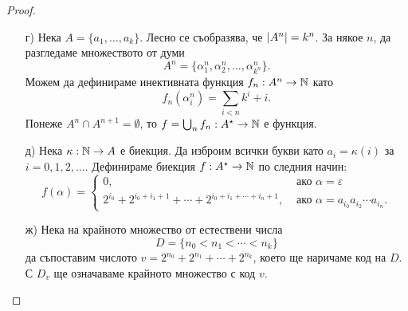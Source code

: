 \begin{proof}
  \begin{enumerate}[a)]
  \item[г)]
    Нека $A = \{a_1,\dots,a_k\}$.
    Лесно се съобразява, че $\lvert{A^n}\rvert = k^n$.
    За някое $n$, да разгледаме множеството от думи 
    \[A^n = \{\alpha^n_{1},\alpha^n_{2},\dots, \alpha^n_{{k^n}}\}.\]
    Можем да дефинираме инективната функция $f_n : A^n \to \mathbb{N}$ като
    \[f_n(\alpha^n_{i}) = \sum_{i<n} k^i + i.\]
    Понеже $A^n \cap A^{n+1} = \emptyset$, 
    то $f = \bigcup_n f_n : A^\star \to \mathbb{N}$ е функция.
  \item[д)]
    Нека $\kappa:\mathbb{N} \to A$ е биекция.
    Да изброим всички букви като $a_i = \kappa(i)$ за $i = 0,1,2,\dots$.
    Дефинираме биекция $f:A^\star \to \mathbb{N}$ по следния начин:
    \[
    f(\alpha) = 
    \begin{cases}
      0,                             & \text{ ако } \alpha = \varepsilon\\
      2^{i_0} + 2^{i_0+i_1+1} + \cdots + 2^{i_0+i_1+\cdots+i_n+1}, & \text{ ако } \alpha = a_{i_0}a_{i_2}\cdots a_{i_n}.
    \end{cases}
    \]
  \item[ж)]
    Нека на крайното множество от естествени числа
    \[D = \{n_0 < n_1 < \cdots < n_k\}\]
    да съпоставим числото $v = 2^{n_0} + 2^{n_1} + \cdots + 2^{n_k}$, което ще наричаме код на $D$.
    С $D_v$ ще означаваме крайното множество с код $v$.
    

\end{enumerate}
\end{proof}
